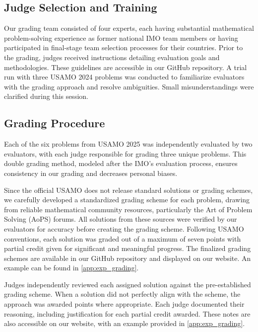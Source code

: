 \subsection{Judge Selection and Training}
\vspace{-1mm}
Our grading team consisted of four experts, each having substantial mathematical problem-solving experience as former national IMO team members or having participated in final-stage team selection processes for their countries. Prior to the grading, judges received instructions detailing evaluation goals and methodologies. These guidelines are accessible in our GitHub repository. A trial run with three USAMO 2024 problems was conducted to familiarize evaluators with the grading approach and resolve ambiguities. Small misunderstandings were clarified during this session.

\subsection{Grading Procedure}

Each of the six problems from USAMO 2025 was independently evaluated by two evaluators, with each judge responsible for grading three unique problems. This double grading method, modeled after the IMO's evaluation process, ensures consistency in our grading and decreases personal biases.

Since the official USAMO does not release standard solutions or grading schemes, we carefully developed a standardized grading scheme for each problem, drawing from reliable mathematical community resources, particularly the Art of Problem Solving (AoPS) forums. All solutions from these sources were verified by our evaluators for accuracy before creating the grading scheme. Following USAMO conventions, each solution was graded out of a maximum of seven points with partial credit given for significant and meaningful progress. The finalized grading schemes are available in our GitHub repository and displayed on our website. An example can be found in \cref{app:exp_grading}.

Judges independently reviewed each assigned solution against the pre-established grading scheme. When a solution did not perfectly align with the scheme, the approach was awarded points where appropriate. Each judge documented their reasoning, including justification for each partial credit awarded. These notes are also accessible on our website, with an example provided in \cref{app:exp_grading}.

